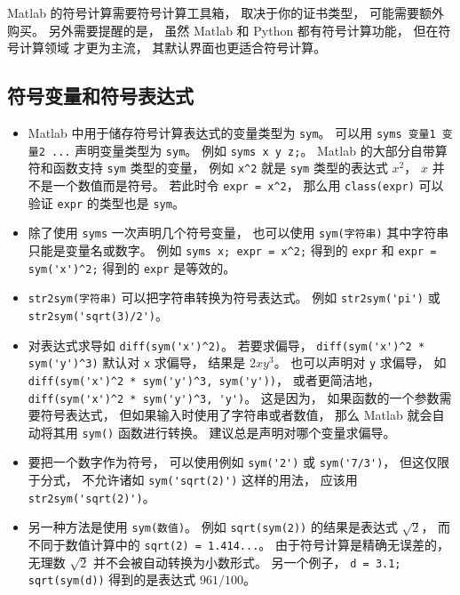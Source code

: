 

Matlab 的符号计算需要符号计算工具箱， 取决于你的证书类型， 可能需要额外购买。 另外需要提醒的是， 虽然 Matlab 和 Python 都有符号计算功能， 但在符号计算领域  才更为主流， 其默认界面也更适合符号计算。

\subsection{符号变量和符号表达式}
\begin{itemize}
\item Matlab 中用于储存符号计算表达式的变量类型为 \verb`sym`。 可以用 \verb`syms 变量1 变量2 ...` 声明变量类型为 \verb`sym`。 例如 \verb`syms x y z;`。
Matlab 的大部分自带算符和函数支持 \verb`sym` 类型的变量， 例如 \verb`x^2` 就是 \verb`sym` 类型的表达式 $x^2$， $x$ 并不是一个数值而是符号。 若此时令 \verb`expr = x^2`， 那么用 \verb`class(expr)` 可以验证 \verb`expr` 的类型也是 \verb`sym`。

\item 除了使用 \verb`syms` 一次声明几个符号变量， 也可以使用 \verb`sym(字符串)` 其中字符串只能是变量名或数字。 例如 \verb`syms x; expr = x^2;` 得到的 \verb`expr` 和 \verb`expr = sym('x')^2;` 得到的 \verb`expr` 是等效的。

\item \verb`str2sym(字符串)` 可以把字符串转换为符号表达式。 例如 \verb`str2sym('pi')` 或 \verb`str2sym('sqrt(3)/2')`。

\item  对表达式求导如 \verb`diff(sym('x')^2)`。 若要求偏导， \verb`diff(sym('x')^2 * sym('y')^3)` 默认对 \verb`x` 求偏导， 结果是 $2x y^3$。 也可以声明对 \verb`y` 求偏导， 如 \verb`diff(sym('x')^2 * sym('y')^3, sym('y'))`， 或者更简洁地， \verb`diff(sym('x')^2 * sym('y')^3, 'y')`。 这是因为， 如果函数的一个参数需要符号表达式， 但如果输入时使用了字符串或者数值， 那么 Matlab 就会自动将其用 \verb`sym()` 函数进行转换。 建议总是声明对哪个变量求偏导。

\item  要把一个数字作为符号， 可以使用例如 \verb`sym('2')` 或 \verb`sym('7/3')`， 但这仅限于分式， 不允许诸如 \verb`sym('sqrt(2)')` 这样的用法， 应该用 \verb`str2sym('sqrt(2)')`。

\item 另一种方法是使用 \verb`sym(数值)`。 例如 \verb`sqrt(sym(2))` 的结果是表达式 $\sqrt 2$， 而不同于数值计算中的 \verb`sqrt(2) = 1.414...`。 由于符号计算是精确无误差的， 无理数 $\sqrt{2}$ 并不会被自动转换为小数形式。 另一个例子， \verb`d = 3.1; sqrt(sym(d))` 得到的是表达式 $961/100$。


\end{itemize}
